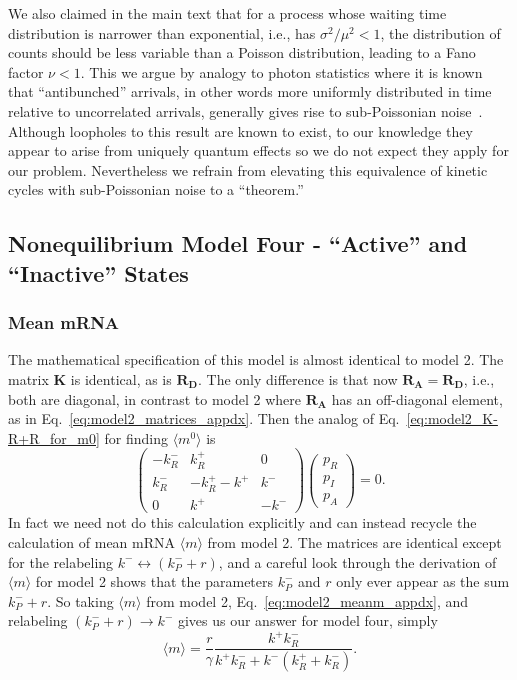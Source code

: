 We also claimed in the main text that for a process whose waiting time
distribution is narrower than exponential, i.e., has $\sigma^2/\mu^2<1$,
the distribution of counts should be less variable than a Poisson
distribution, leading to a Fano factor $\nu<1$.
This we argue by analogy to photon statistics where it is known that
``antibunched'' arrivals, in other words more uniformly distributed in
time relative to uncorrelated arrivals, generally gives rise to
sub-Poissonian noise~\cite{Paul1982, Zou1990}. Although loopholes to this
result are known to exist, to our knowledge they appear to arise from
uniquely quantum effects so we do not expect they apply for our problem.
Nevertheless we refrain from elevating this equivalence of
kinetic cycles with sub-Poissonian noise to a ``theorem.''

\subsection{Nonequilibrium Model Four - ``Active'' and ``Inactive'' States}
\subsubsection{Mean mRNA}
The mathematical specification of this model is almost identical to model 2.
The matrix $\mathbf{K}$ is identical, as is $\mathbf{R_D}$. The only difference
is that now $\mathbf{R_A}=\mathbf{R_D}$, i.e., both are diagonal, in contrast to
model 2 where $\mathbf{R_A}$ has an off-diagonal element, as in
Eq.~\ref{eq:model2_matrices_appdx}. Then the analog of
Eq.~\ref{eq:model2_K-R+R_for_m0} for finding $\langle{m}^0\rangle$ is
\begin{equation}
\begin{pmatrix} -k_R^- & k_R^+ & 0 \\
        k_R^- & -k_R^+ -k^+ & k^-\\
        0 & k^+ & -k^-
\end{pmatrix}
\begin{pmatrix}
    p_R \\ p_I \\ p_A
\end{pmatrix}
= 0.
\end{equation}
In fact we need not do this calculation explicitly and can instead recycle the
calculation of mean mRNA $\langle{m}\rangle$ from model 2. The matrices are
identical except for the relabeling $k^- \longleftrightarrow (k_P^- + r)$, and
a careful look through the derivation of $\langle{m}\rangle$ for model 2 shows
that the parameters $k_P^-$ and $r$ only ever appear as the sum $k_P^- + r$. So
taking $\langle{m}\rangle$ from model 2, Eq.~\ref{eq:model2_meanm_appdx}, and
relabeling $(k_P^- + r) \rightarrow k^-$ gives us our answer for model four,
simply
\begin{equation}
\langle{m}\rangle = \frac{r}{\gamma}
        \frac{k^+ k_R^-} {k^+ k_R^- + k^- (k_R^+ + k_R^-)}.
\end{equation}


